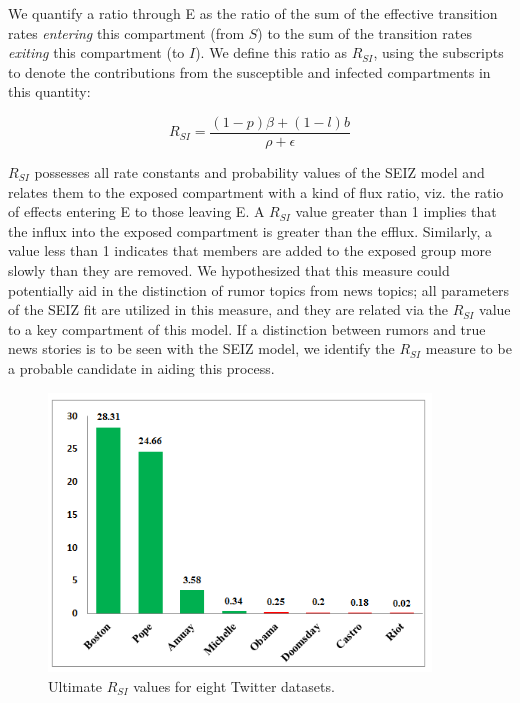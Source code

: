 We quantify a ratio through E as the ratio of the sum of the effective transition rates \textit{entering} this compartment (from $S$) to the sum of the transition rates \textit{exiting} this compartment (to $I$). We define this ratio as $R_{SI}$, using the subscripts to denote the contributions from the susceptible and infected compartments in this quantity:

\begin{equation}
\label{eq:R_es}
R_{SI}=\frac{(1-p)\beta +(1-l)b}{\rho + \epsilon}
\end{equation}

$R_{SI}$ possesses all rate constants and probability values of the SEIZ model and relates them to the exposed compartment with a kind of flux ratio, viz.
the ratio of effects entering E to those leaving E. A $R_{SI}$ value greater than 1 implies that the influx into the exposed compartment is greater than the efflux. Similarly, a value less than 1 indicates that members are added to the exposed group more slowly than they are removed. We hypothesized that this measure could potentially aid in the distinction of rumor topics from news topics; all parameters of the SEIZ fit are utilized in this measure, and they are related via the $R_{SI}$ value to a key compartment of this model. If a distinction between rumors and true news stories is to be seen with the SEIZ model, we identify the $R_{SI}$ measure to be a probable candidate in aiding this process.

\begin{figure}[h]
\centering
  \includegraphics[width=4in]{pictures/reproductive-ratio.png}
   \caption{Ultimate $R_{SI}$ values for eight Twitter datasets.}
  \label{fig:static_ratio}
\end{figure}


